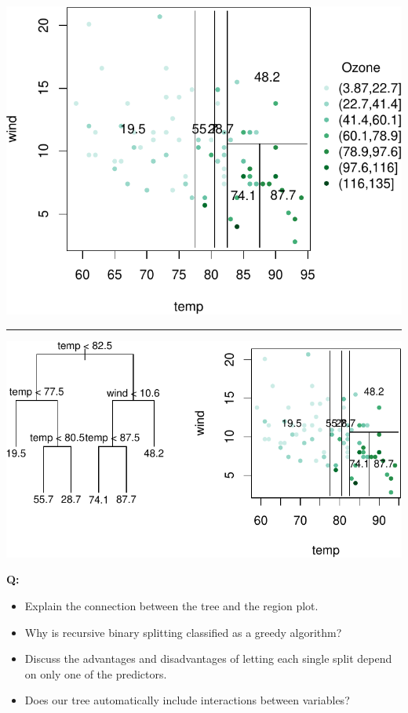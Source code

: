 \documentclass[]{article}
\providecommand{\tightlist}{%
  \setlength{\itemsep}{0pt}\setlength{\parskip}{0pt}}
\begin{document}
\includegraphics{8Trees_files/figure-latex/unnamed-chunk-8-1.pdf}

\begin{center}\rule{0.5\linewidth}{\linethickness}\end{center}

\includegraphics{8Trees_files/figure-latex/unnamed-chunk-9-1.pdf}

\textbf{Q:}

\begin{itemize}
\tightlist
\item
  Explain the connection between the tree and the region plot.
\item
  Why is recursive binary splitting classified as a greedy algorithm?
\item
  Discuss the advantages and disadvantages of letting each single split
  depend on only one of the predictors.
\item
  Does our tree automatically include interactions between variables?
\end{itemize}
\end{document}
